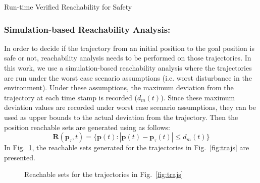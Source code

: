 \begin{section}{Run-time Verified Reachability for Safety}
\subsubsection{Simulation-based Reachability Analysis:}
In order to decide if the trajectory from an initial position to the goal position is safe or not, reachability analysis needs to be performed on those trajectories. In this work, we use a simulation-based reachability analysis where the trajectories are run under the worst case scenario assumptions (i.e. worst disturbance in the environment). Under these assumptions, the maximum deviation from the trajectory at each time stamp is recorded ($ d_m(t) $). Since these maximum deviation values are recorded under worst case scenario assumptions, they can be used as upper bounds to the actual deviation from the trajectory. Then the position reachable sets are generated using as follows:
\begin{equation}
	\boldsymbol{R}(\boldsymbol{p}_\tau,t) = \{ \boldsymbol{p}(t): | \boldsymbol{p}(t) - \boldsymbol{p}_\tau(t) | \leq d_m(t) \}
	\label{eq:reach}
\end{equation}
In Fig.~\ref{fig:traj_reach}, the reachable sets generated for the trajectories in Fig.~\ref{fig:trajs} are presented.
\begin{figure}[h]
	\centering
	\caption{Reachable sets for the trajectories in Fig.~\ref{fig:trajs}}
	\label{fig:traj_reach}
\end{figure}


\end{section}
